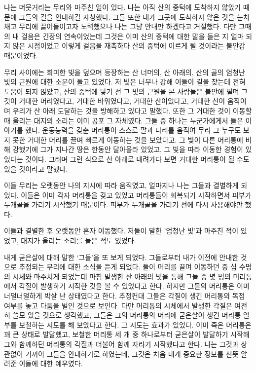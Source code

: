 \begin{article}
나는 머뭇거리는 무리와 마주친 일이 있다. 나는 아직 산의 중턱에 도착하지 않았기 때문에 그들의 길을 안내하길 자청했다. 그들 또한 내가 그곳에 도착하지 않은 것을 눈치채고 무리에 끌어들이고자 노력했으나 나는 그냥 안내만 하겠다고 거절했다. 다만 그때의 내 걸음은 긴장의 연속이었는데 그것은 이미 산의 중턱에 대한 말을 들은 지 얼마 되지 않은 시점이었고 이렇게 걸음을 재촉하다 산의 중턱에 이르게 될 것이라는 불안감 때문이었다.

무리 사이에는 희미한 빛을 덮으며 등장하는 산 너머의, 산 아래의, 산의 골의 엄청난 빛의 근원에 대한 소문이 돌고 있었다. 저 빛은 너무나 강해 이들이 길을 찾는데 전혀 도움이 되지 않았고, 산의 중턱에 닿기 전 그 빛의 근원을 본 사람들은 불안에 떨며 그것이 거대한 머리였다고, 거대한 바위였다고, 거대한 산이었다고, 거대한 산이 움직이며 우리가 산 아래 도달하는 것을 방해하고 있다고 말했다. 또한 그 거대한 것이 이동할 때 울리는 대지의 소리는 이미 공포 그 자체였다. 그들 중 하나는 누군가에게서 들은 이야기를 했다. 운동능력을 갖춘 머리통이 스스로 팔과 다리를 움직여 무리 그 누구도 보지 못한 거대한 머리를 끌며 빠르게 이동하는 것을 보았다고. 그 빛이 다른 머리통에 비해 강했기에 그가 지나간 땅은 한동안 달아올라 있었고, 그 빛을 따라 이동한 경험이 있었다는 것이다. 그러며 그런 식으로 산 아래로 내려가다 보면 거대한 머리통이 될 수도 있을 것이라고 말했다.

이들 무리는 오랫동안 나의 지시에 따라 움직였고, 얼마지나 나는 그들과 결별하게 되었다. 이들은 이미 각자 머리통을 갖고 있었고 머리통들이 회복되기 시작하면서 피부가 두개골을 가리기 시작했기 때문이다. 피부가 두개골을 가리기 전에 다시 사용해야만 했다.

이들과 결별한 후 오랫동안 혼자 이동했다. 저들이 말한 '엄청난 빛'과 마주친 적이 있었고, 대지가 울리는 소리를 들은 적도 있었다.

내게 굳은살에 대해 말한 `그들'을 또 보게 되었다. 그들로부터 내가 이전에 안내한 것으로 추정되는 무리에 대한 소식을 듣게 되었다. 둘이 머리를 끌며 이동하던 중 십 수명의 시체와 마주치게 되었는데 마침 발생한 산 아래의 빛을 통해 그들 중 몇 명의 머리통에서 각질이 발생하기 시작한 것을 볼 수 있었다고 한다. 하지만 그들의 머리통은 이미 너덜너덜하게 박살 난 상태였다고 한다. 추정컨대 그들은 각질이 생긴 머리통의 독점 여부를 놓고 다툼을 벌인 것으로 보인다. 다만 머리통의 시체에서 발생한 각질은 여전히 쓸모 있을 것으로 생각했고, 그들은 그의 머리통의 머리에 굳은살이 생긴 머리통 일부를 보철하는 시도를 해 보았다고 한다. 그 시도는 효과가 있었다. 이미 죽은 머리통은 꽤 큰 상태로 발달했고, 보철한 머리통 세 개 중 하나로부터 굳은살이 발달하기 시작해 그와 함께하던 머리통의 각질과 더불어 함께 자라기 시작했다고 한다. 나는 그것과 상관없이 기꺼이 그들을 안내하기로 하였는데, 그것은 처음 내게 중요한 정보를 선뜻 알려준 이들에 대한 예우였다.


\end{article}
